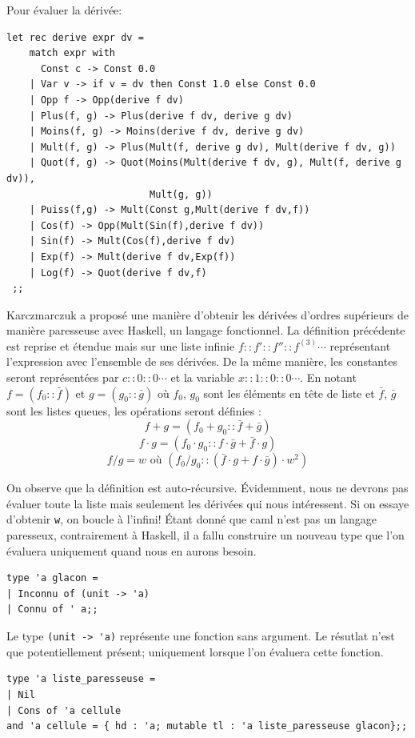 Pour \'evaluer la d\'eriv\'ee: 

{\small
\begin{verbatim}
let rec derive expr dv =
    match expr with
      Const c -> Const 0.0
    | Var v -> if v = dv then Const 1.0 else Const 0.0
    | Opp f -> Opp(derive f dv)
    | Plus(f, g) -> Plus(derive f dv, derive g dv)
    | Moins(f, g) -> Moins(derive f dv, derive g dv)
    | Mult(f, g) -> Plus(Mult(f, derive g dv), Mult(derive f dv, g))
    | Quot(f, g) -> Quot(Moins(Mult(derive f dv, g), Mult(f, derive g dv)),
                         Mult(g, g))
    | Puiss(f,g) -> Mult(Const g,Mult(derive f dv,f))
    | Cos(f) -> Opp(Mult(Sin(f),derive f dv))
    | Sin(f) -> Mult(Cos(f),derive f dv)
    | Exp(f) -> Mult(derive f dv,Exp(f))
    | Log(f) -> Quot(derive f dv,f)
 ;;
\end{verbatim}
}
\noindent
Karczmarczuk a propos\'e une mani\`ere d'obtenir les d\'eriv\'ees d'ordres sup\'erieurs de mani\`ere paresseuse avec Haskell,
un langage fonctionnel. La d\'efinition pr\'ec\'edente est reprise et \'etendue mais sur une liste infinie $f::f'::f''::f^{(3)}\cdots $
repr\'esentant l'expression avec l'ensemble de ses d\'eriv\'ees. 
De la même mani\`ere, les constantes seront repr\'esent\'ees par $c::0::0\cdots$
et la variable $x::1::0::0\cdots$. En notant $f=(f_0::\bar f)$ et $g=(g_0::\bar g)$ o\`u $f_0$, $g_0$ sont
les \'el\'ements en tête de liste et $\bar f$, $\bar g$ sont les listes queues, les op\'erations seront d\'efinies :
$$f+g = (f_0+g_0::\bar f+\bar g)$$
$$f\cdot g = (f_0\cdot g_0::f\cdot \bar g+\bar f\cdot g)$$
$$f/g = w \text{  o\`u  }(f_0/g_0::(\bar f\cdot g+f \cdot\bar g)\cdot w^2)$$


\noindent
On observe que la d\'efinition est auto-r\'ecursive. \'Evidemment, nous ne devrons pas \'evaluer toute la liste mais seulement les 
d\'eriv\'ees qui nous int\'eressent. Si on essaye d'obtenir {\tt w}, on boucle \`a l'infini! 
\'Etant donn\'e que caml n'est pas un langage paresseux, contrairement \`a Haskell, il a fallu construire un nouveau type que l'on 
\'evaluera uniquement quand nous en aurons besoin.


{\small
\begin{verbatim}
type 'a glacon =
| Inconnu of (unit -> 'a)
| Connu of ' a;;
\end{verbatim}
}
\noindent
Le type \verb!(unit -> 'a)! repr\'esente une fonction sans argument. Le r\'esutlat n'est que potentiellement pr\'esent; uniquement 
lorsque l'on \'evaluera cette fonction.

{\small
\begin{verbatim}
type 'a liste_paresseuse =
| Nil
| Cons of 'a cellule
and 'a cellule = { hd : 'a; mutable tl : 'a liste_paresseuse glacon};;
\end{verbatim}
}


